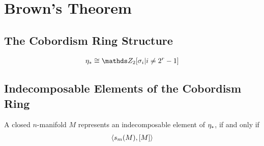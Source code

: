 % 

\chapter{Brown's Theorem}

\section{The Cobordism Ring Structure}

\begin{LemDef} %
\end{LemDef}

\begin{Thm} %
  \begin{gather*}
    \c_* \cong \Zmod2[\sigma_i| i\neq 2^r-1]
  \end{gather*}
\end{Thm}


\section{Indecomposable Elements of the Cobordism Ring}

\begin{Def}[Classes $s_I(M)$]
\end{Def}

\begin{Thm}
  A closed $n$-manifold $M$ represents an indecomposable element of
  $\eta_*$, if and only if
  \begin{gather*}
    \langle s_m(M), [M] \rangle
  \end{gather*}
\end{Thm}

